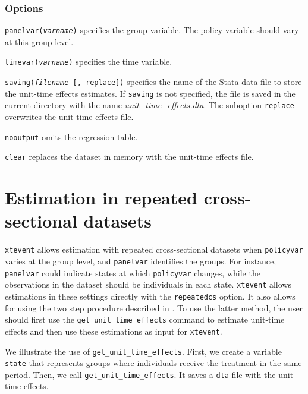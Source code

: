 \documentclass[12pt]{article}
\begin{document}
\subsubsection{Options}
\hangpara
\texttt{panelvar({\it varname})} specifies the group variable.
The policy variable should vary at this group level.

\hangpara
\texttt{timevar({\it varname})} specifies the time variable.

\hangpara
\texttt{saving({\it filename} [, replace])} specifies the name of the Stata data file to store the unit-time effects estimates.
If \texttt{saving} is not specified, the file is saved in the current directory with the name {\it unit\_time\_effects.dta}.
The suboption \texttt{replace} overwrites the unit-time effects file.

\hangpara
\texttt{nooutput} omits the regression table.

\hangpara
\texttt{clear} replaces the dataset in memory with the unit-time effects file.




\section{Estimation in repeated cross-sectional datasets}
\label{sec:xsection}

\texttt{xtevent} allows estimation with repeated cross-sectional datasets when \texttt{policyvar} varies at the group level, and \texttt{panelvar} identifies the groups.
For instance, \texttt{panelvar} could indicate states at which \texttt{policyvar} changes, while the observations in the dataset should be individuals in each state.
\texttt{xtevent} allows estimations in these settings directly with the \texttt{repeatedcs} option.
It also allows for using the two step procedure described in \citet{hansen2007generalized}.
To use the latter method, the user should first use the \texttt{get\_unit\_time\_effects} command to estimate unit-time effects and then use these estimations as input for \texttt{xtevent}.

We illustrate the use of \texttt{get\_unit\_time\_effects}.
First, we create a variable \texttt{state} that represents groups where individuals receive the treatment in the same period.
Then, we call \texttt{get\_unit\_time\_effects}.
It saves a \texttt{dta} file with the unit-time effects.

\begin{stlog}
\nullskip
\end{stlog}
\end{document}
